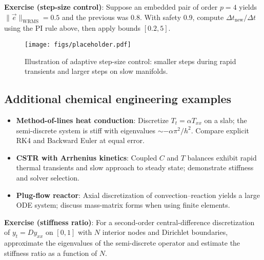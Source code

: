 \begin{exampleBox}
    \textbf{Exercise (step-size control)}: Suppose an embedded pair of order $p=4$ yields $\|\vec{e}\|_{\mathrm{WRMS}}=0.5$ and the previous was 0.8. With safety 0.9, compute $\Delta t_{\mathrm{new}}/\Delta t$ using the PI rule above, then apply bounds $[0.2,5]$.
\end{exampleBox}

\begin{figure}[h!]
    \centering
    \texttt{[image: figs/placeholder.pdf]}
    \caption{Illustration of adaptive step-size control: smaller steps during rapid transients and larger steps on slow manifolds.}
    \label{fig:adaptive-controller}
\end{figure}

\subsection*{Additional chemical engineering examples}
\begin{itemize}
    \item \textbf{Method-of-lines heat conduction}: Discretize $T_t = \alpha T_{xx}$ on a slab; the semi-discrete system is stiff with eigenvalues $\sim -\alpha\pi^2/h^2$. Compare explicit RK4 and Backward Euler at equal error.
    \item \textbf{CSTR with Arrhenius kinetics}: Coupled $C$ and $T$ balances exhibit rapid thermal transients and slow approach to steady state; demonstrate stiffness and solver selection.
    \item \textbf{Plug-flow reactor}: Axial discretization of convection--reaction yields a large ODE system; discuss mass-matrix forms when using finite elements.
\end{itemize}

\begin{exampleBox}
    \textbf{Exercise (stiffness ratio)}: For a second-order central-difference discretization of $y_t=D y_{xx}$ on $[0,1]$ with $N$ interior nodes and Dirichlet boundaries, approximate the eigenvalues of the semi-discrete operator and estimate the stiffness ratio as a function of $N$.
\end{exampleBox}